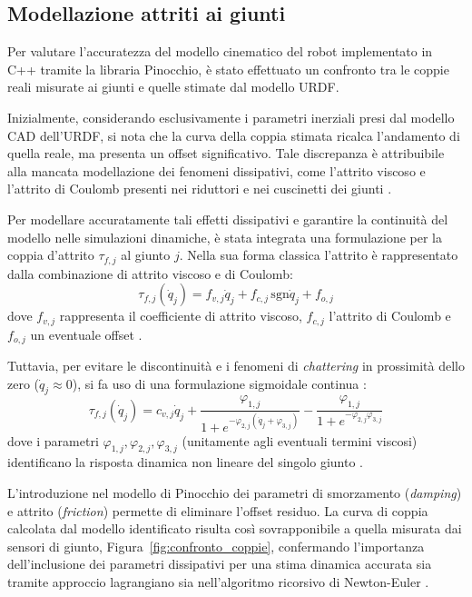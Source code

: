 \subsection{Modellazione attriti ai giunti}
\label{sec:attriti}
Per valutare l'accuratezza del modello cinematico del robot implementato in C++ tramite la libraria Pinocchio, è stato effettuato un confronto tra le coppie reali misurate ai giunti e quelle stimate dal modello URDF.

Inizialmente, considerando esclusivamente i parametri inerziali presi dal modello CAD dell'URDF, si nota che la curva della coppia stimata ricalca l'andamento di quella reale, ma presenta un offset significativo. Tale discrepanza è attribuibile alla mancata modellazione dei fenomeni dissipativi, come l'attrito viscoso e l'attrito di Coulomb presenti nei riduttori e nei cuscinetti dei giunti \cite{gaz2019dynamic}.

Per modellare accuratamente tali effetti dissipativi e garantire la continuità del modello nelle simulazioni dinamiche, è stata integrata una formulazione per la coppia d'attrito $\tau_{f,j}$ al giunto $j$. Nella sua forma classica l'attrito è rappresentato dalla combinazione di attrito viscoso e di Coulomb:
\begin{equation}
	\tau_{f,j}(\dot{q}_j) = f_{v,j} \dot{q}_j + f_{c,j} \, \mathrm{sgn}\dot{q}_j + f_{o,j}
\end{equation}
dove $f_{v,j}$ rappresenta il coefficiente di attrito viscoso, $f_{c,j}$ l'attrito di Coulomb e $f_{o,j}$ un eventuale offset \cite{gaz2019dynamic}.

Tuttavia, per evitare le discontinuità e i fenomeni di \textit{chattering} in prossimità dello zero ($\dot{q}_j \approx 0$), si fa uso di una formulazione sigmoidale continua \cite{gaz2019dynamic}:
\begin{equation}
\tau_{f,j}(\dot{q}_j) = c_{v,j} \dot{q}_j + \frac{\varphi_{1,j}}{1 + e^{-\varphi_{2,j} (\dot{q}_j + \varphi_{3,j})}} - \frac{\varphi_{1,j}}{1 + e^{-\varphi_{2,j} \varphi_{3,j}}}
\end{equation}
dove i parametri $\varphi_{1,j}, \varphi_{2,j}, \varphi_{3,j}$ (unitamente agli eventuali termini viscosi) identificano la risposta dinamica non lineare del singolo giunto \cite{gaz2019dynamic}.

L'introduzione nel modello di Pinocchio dei parametri di smorzamento (\textit{damping}) e attrito (\textit{friction}) permette di eliminare l'offset residuo. La curva di coppia calcolata dal modello identificato risulta così sovrapponibile a quella misurata dai sensori di giunto, Figura~\ref{fig:confronto_coppie}, confermando l'importanza dell'inclusione dei parametri dissipativi per una stima dinamica accurata sia tramite approccio lagrangiano sia nell'algoritmo ricorsivo di Newton-Euler \cite{gaz2019dynamic}.


